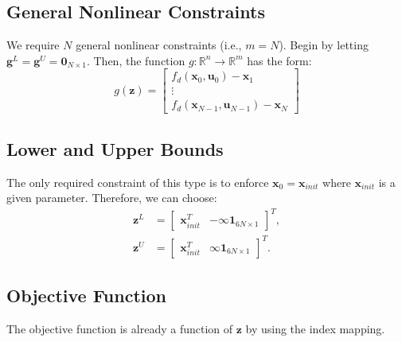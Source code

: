 \documentclass[12pt, letterpaper]{report}
\newcommand{\vect}[1]{\boldsymbol{\mathbf{#1}}}
\newcommand{\mat}[1]{\begin{bmatrix} #1 \end{bmatrix}}
\begin{document}
\subsection*{General Nonlinear Constraints}
We require $N$ general nonlinear constraints (i.e., $m=N$). Begin by
letting $\vect{g}^L = \vect{g}^U = \vect{0}_{N\times 1}$. Then, the
function $g:\mathbb{R}^{n}\rightarrow \mathbb{R}^m$ has the form:
\begin{equation}
  g(\vect{z}) = \mat{f_d(\vect{x}_0,\vect{u}_0) - \vect{x}_1 \\ 
  \vdots \\ f_d(\vect{x}_{N-1},\vect{u}_{N-1}) - \vect{x}_N}
\end{equation}

\subsection*{Lower and Upper Bounds}
The only required constraint of this type is to enforce $\vect{x}_0 =
\vect{x}_{init}$ where $\vect{x}_{init}$ is a given parameter.
Therefore, we can choose:
\begin{subequations}
  \begin{align}
    \vect{z}^L &= \mat{\vect{x}_{init}^T & -\infty\vect{1}_{6N\times
    1}}^T,\\
    \vect{z}^U &= \mat{\vect{x}_{init}^T & \infty\vect{1}_{6N\times
    1}}^T.
  \end{align}
\end{subequations}

\subsection*{Objective Function}
The objective function is already a function of $\vect{z}$ by using the
index mapping.


\end{document}
